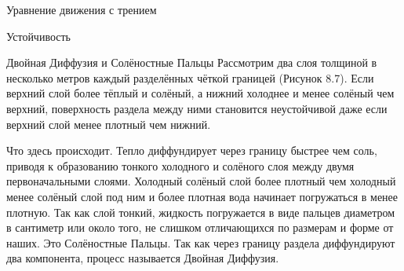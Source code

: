 \begin{chapter}{Уравнение движения с трением}
\begin{section}{Устойчивость}
\begin{paragraph}{Двойная Диффузия и Солёностные Пальцы}
Рассмотрим два слоя толщиной в несколько метров каждый разделённых
чёткой границей (Рисунок 8.7). Если верхний слой более тёплый и
солёный, а нижний холоднее и менее солёный чем верхний, поверхность
раздела между ними становится неустойчивой даже если верхний слой
менее плотный чем нижний.
%

Что здесь происходит. Тепло диффундирует через границу быстрее чем
соль, приводя к образованию тонкого холодного и солёного слоя между
двумя первоначальными слоями. Холодный солёный слой более плотный чем
холодный менее солёный слой под ним и более плотная вода начинает
погружаться в менее плотную. Так как слой тонкий, жидкость погружается
в виде пальцев диаметром в сантиметр или около того, не слишком
отличающихся по размерам и форме от наших. Это Солёностные
Пальцы. Так как через границу раздела диффундируют два компонента,
процесс называется Двойная Диффузия.
%


\end{paragraph}
\end{section}
\end{chapter}

